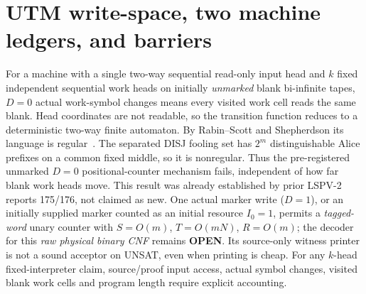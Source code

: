 \documentclass[11pt]{article}
\newcommand{\OPEN}{\textbf{OPEN}}
\begin{document}
\section{UTM write-space, two machine ledgers, and barriers}
For a machine with a single two-way sequential read-only input head and $k$ fixed independent sequential work heads on initially \emph{unmarked} blank bi-infinite tapes, $D=0$ actual work-symbol changes means every visited work cell reads the same blank. Head coordinates are not readable, so the transition function reduces to a deterministic two-way finite automaton. By Rabin--Scott and Shepherdson its language is regular~\cite{RS,Shepherdson}. The separated DISJ fooling set has $2^m$ distinguishable Alice prefixes on a common fixed middle, so it is nonregular. Thus the pre-registered unmarked $D=0$ positional-counter mechanism fails, independent of how far blank work heads move. This result was already established by prior LSPV-2 reports 175/176, not claimed as new. One actual marker write ($D=1$), or an initially supplied marker counted as an initial resource $I_0=1$, permits a \emph{tagged-word} unary counter with $S=O(m)$, $T=O(mN)$, $R=O(m)$; the decoder for this \emph{raw physical binary CNF} remains \OPEN. Its source-only witness printer is not a sound acceptor on UNSAT, even when printing is cheap. For any $k$-head fixed-interpreter claim, source/proof input access, actual symbol changes, visited blank work cells and program length require explicit accounting.
\end{document}
